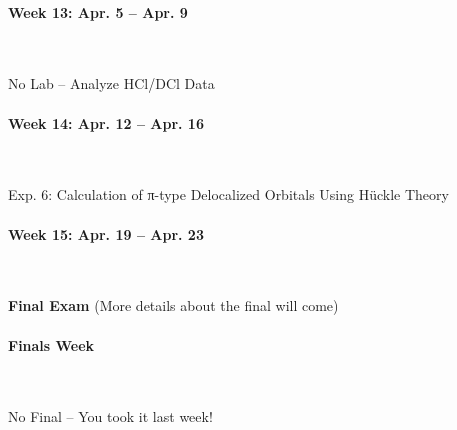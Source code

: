 \documentclass[12pt, letterpaper]{article}
\begin{document}
\paragraph{Week 13: Apr. 5 -- Apr. 9}~

No Lab -- Analyze HCl/DCl Data

\paragraph{Week 14: Apr. 12 -- Apr. 16}~

Exp. 6: Calculation of π-type Delocalized Orbitals Using Hückle Theory

\paragraph{Week 15: Apr. 19 -- Apr. 23}~

\textbf{Final Exam} (More details about the final will come)

\paragraph{Finals Week}~

No Final -- You took it last week!
\end{document}
